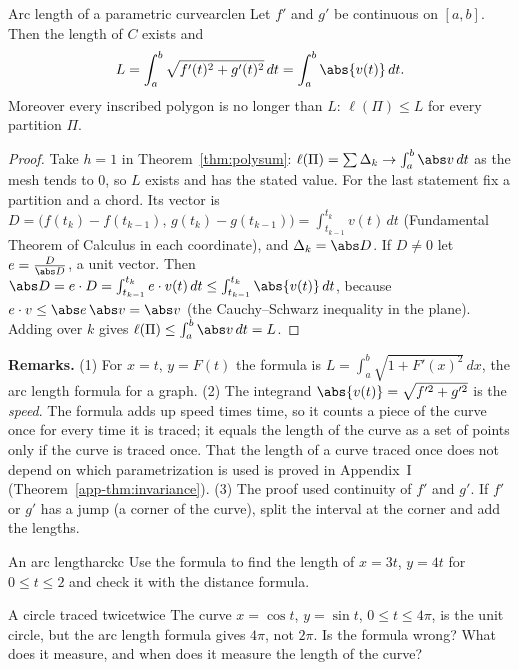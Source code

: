 \documentclass[11pt]{article}
\begin{document}
\begin{thm}{Arc length of a parametric curve}{arclen}
Let $f'$ and $g'$ be continuous on $[a,b]$. Then the length of $C$ exists and
\[
L=\int_a^b\sqrt{f'(t)^2+g'(t)^2}\,dt=\int_a^b\abs{v(t)}\,dt.
\]
Moreover every inscribed polygon is no longer than $L$: $\ell(\Pi)\le L$ for every partition $\Pi$.
\end{thm}
\begin{proof}
Take $h=1$ in Theorem~\ref{thm:polysum}: $\ell(\Pi)=\sum\Delta_k\to\int_a^b\abs v\,dt$ as the mesh tends to $0$, so $L$ exists and has the stated value. For the last statement fix a partition and a chord. Its vector is $D=\bigl(f(t_k)-f(t_{k-1}),\,g(t_k)-g(t_{k-1})\bigr)=\int_{t_{k-1}}^{t_k}v(t)\,dt$ (Fundamental Theorem of Calculus in each coordinate), and $\Delta_k=\abs D$. If $D\ne0$ let $e=\frac D{\abs D}$, a unit vector. Then $\abs D=e\cdot D=\int_{t_{k-1}}^{t_k}e\cdot v(t)\,dt\le\int_{t_{k-1}}^{t_k}\abs{v(t)}\,dt$, because $e\cdot v\le\abs e\,\abs v=\abs v$ (the Cauchy--Schwarz inequality in the plane). Adding over $k$ gives $\ell(\Pi)\le\int_a^b\abs v\,dt=L$.
\end{proof}

\textbf{Remarks.} (1) For $x=t$, $y=F(t)$ the formula is $L=\int_a^b\sqrt{1+F'(x)^2}\,dx$, the arc length formula for a graph. (2) The integrand $\abs{v(t)}=\sqrt{f'^2+g'^2}$ is the \emph{speed}. The formula adds up speed times time, so it counts a piece of the curve once for every time it is traced; it equals the length of the curve as a set of points only if the curve is traced once. That the length of a curve traced once does not depend on which parametrization is used is proved in Appendix~I (Theorem~\ref{app-thm:invariance}). (3) The proof used continuity of $f'$ and $g'$. If $f'$ or $g'$ has a jump (a corner of the curve), split the interval at the corner and add the lengths.

\begin{kc}{An arc length}{arckc}
Use the formula to find the length of $x=3t$, $y=4t$ for $0\le t\le2$ and check it with the distance formula.
\end{kc}

\begin{think}{A circle traced twice}{twice}
The curve $x=\cos t$, $y=\sin t$, $0\le t\le4\pi$, is the unit circle, but the arc length formula gives $4\pi$, not $2\pi$. Is the formula wrong? What does it measure, and when does it measure the length of the curve?
\end{think}
\end{document}

